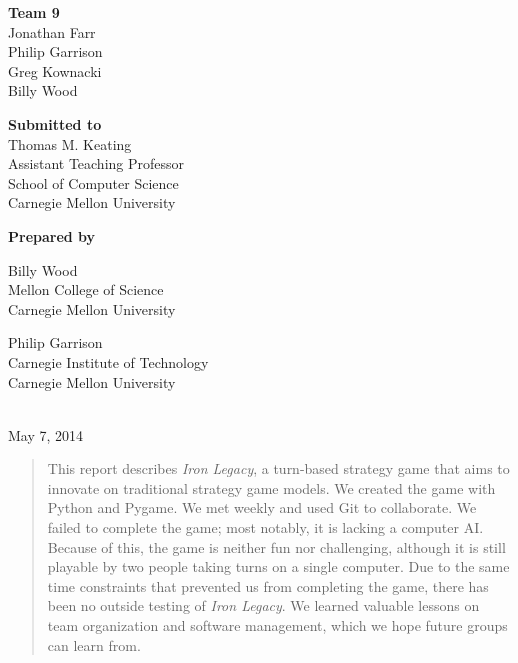 \documentclass{article}
\begin{document}
\vfill

\begin{center}
\textbf{Team 9}\\
Jonathan Farr\\
Philip Garrison\\
Greg Kownacki\\
Billy Wood
\end{center}

\vfill

\begin{center}
\textbf{Submitted to}\\
Thomas M. Keating\\
Assistant Teaching Professor\\
School of Computer Science\\
Carnegie Mellon University
\end{center}

\vfill

\begin{center}
\textbf{Prepared by}\\
\begin{minipage}[c][3.7em][t]{.45\textwidth}
\begin{center}
Billy Wood\\
Mellon College of Science\\
Carnegie Mellon University
\end{center}
\end{minipage}
\begin{minipage}[c][3.7em][t]{.45\textwidth}
\begin{center}
Philip Garrison\\
Carnegie Institute of Technology\\
Carnegie Mellon University
\end{center}
\end{minipage}\\
May 7, 2014
\end{center}

\vfill

\begin{abstract}
This report describes \emph{Iron Legacy}, a turn-based strategy game that aims 
to innovate on traditional strategy game models. We created the game with 
Python and Pygame. We met weekly and used Git to collaborate. We failed to 
complete the game; most notably, it is lacking a computer AI. Because of this, 
the game is neither fun nor challenging, although it is still playable by two
people taking turns on a single computer. Due to the same time constraints that 
prevented us from completing the game, there has been no outside testing of 
\emph{Iron Legacy}. We learned valuable lessons on team organization and 
software management, which we hope future groups can learn from.
\end{abstract}
\end{document}
